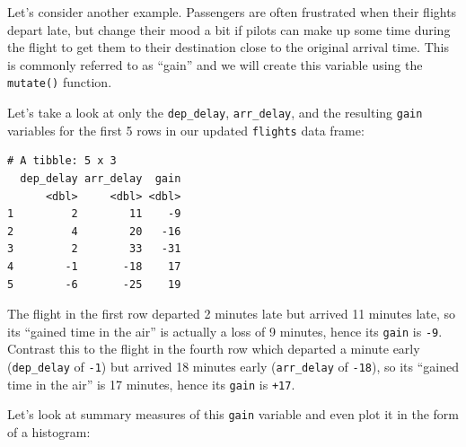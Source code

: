 \documentclass[12pt, krantz2,]{krantz}
\makeatletter
\newenvironment{Shaded}{\begin{snugshade}}{\end{snugshade}}
\newcommand{\DataTypeTok}[1]{\textcolor[rgb]{0.27,0.27,0.27}{#1}}
\newcommand{\KeywordTok}[1]{\textcolor[rgb]{0.27,0.27,0.27}{\textbf{#1}}}
\newcommand{\NormalTok}[1]{#1}
\newcommand{\OperatorTok}[1]{\textcolor[rgb]{0.43,0.43,0.43}{\textbf{#1}}}
\newcommand{\StringTok}[1]{\textcolor[rgb]{0.5,0.5,0.5}{#1}}
\newenvironment{kframe}{%
\medskip{}
\setlength{\fboxsep}{.8em}
 \def\at@end@of@kframe{}%
 \ifinner\ifhmode%
  \def\at@end@of@kframe{\end{minipage}}%
  \begin{minipage}{\columnwidth}%
 \fi\fi%
 \def\FrameCommand##1{\hskip\@totalleftmargin \hskip-\fboxsep
 \colorbox{shadecolor}{##1}\hskip-\fboxsep
     \hskip-\linewidth \hskip-\@totalleftmargin \hskip\columnwidth}%
 \MakeFramed {\advance\hsize-\width
   \@totalleftmargin\z@ \linewidth\hsize
   \@setminipage}}%
 {\par\unskip\endMakeFramed%
 \at@end@of@kframe}
\renewenvironment{Shaded}{\begin{kframe}}{\end{kframe}}
\makeatother
\begin{document}
Let's consider another example. Passengers are often frustrated when their flights depart late, but change their mood a bit if pilots can make up some time during the flight to get them to their destination close to the original arrival time. This is commonly referred to as ``gain'' and we will create this variable using the \texttt{mutate()} function.

\begin{Shaded}
\end{Shaded}

Let's take a look at only the \texttt{dep\_delay}, \texttt{arr\_delay}, and the resulting \texttt{gain} variables for the first 5 rows in our updated \texttt{flights} data frame:

\begin{verbatim}
# A tibble: 5 x 3
  dep_delay arr_delay  gain
      <dbl>     <dbl> <dbl>
1         2        11    -9
2         4        20   -16
3         2        33   -31
4        -1       -18    17
5        -6       -25    19
\end{verbatim}

The flight in the first row departed 2 minutes late but arrived 11 minutes late, so its ``gained time in the air'' is actually a loss of 9 minutes, hence its \texttt{gain} is \texttt{-9}. Contrast this to the flight in the fourth row which departed a minute early (\texttt{dep\_delay} of \texttt{-1}) but arrived 18 minutes early (\texttt{arr\_delay} of \texttt{-18}), so its ``gained time in the air'' is 17 minutes, hence its \texttt{gain} is \texttt{+17}.

Let's look at summary measures of this \texttt{gain} variable and even plot it in the form of a histogram:
\end{document}
